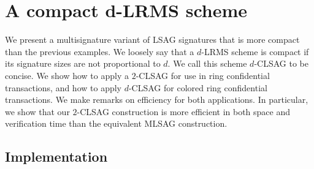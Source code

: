 \documentclass{mrl}
\theoremstyle{plain}
\theoremstyle{definition}
\begin{document}
\section{A compact d-LRMS scheme}

We present a multisignature variant of LSAG signatures that is more compact than the previous examples. We loosely say that a $d$-LRMS scheme is compact if its signature sizes are not proportional to $d$. We call this scheme $d$-CLSAG to be concise. We show how to apply a $2$-CLSAG for use in ring confidential transactions, and how to apply $d$-CLSAG for colored ring confidential transactions. We make remarks on efficiency for both applications. In particular, we show that our $2$-CLSAG construction is more efficient in both space and verification time than the equivalent MLSAG construction.


\subsection{Implementation}\label{sec:implem}
\end{document}
